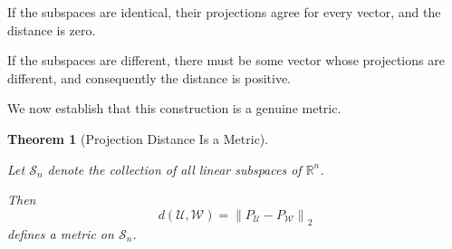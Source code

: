 \documentclass[14pt,letterpaper]{article}
\theoremstyle{plain}
\newtheorem{theorem}{Theorem}[section]
\theoremstyle{definition}
\theoremstyle{remark}
\newcommand{\R}{\mathbb{R}}
\newcommand{\norm}[1]{\left\lVert #1 \right\rVert}
\begin{document}
If the subspaces are identical,
their projections agree
for every vector, and the
distance is zero.

If the subspaces are different,
there must be some vector
whose projections are different,
and consequently the distance
is positive.

We now establish that this
construction is a genuine metric.

\begin{theorem}[Projection Distance Is a Metric]
\label{thm:projection_metric}

Let $\mathscr S_n$ denote
the collection of all linear
subspaces of $\R^n$.

Then
\[
d(\mathcal U,\mathcal W)
=
\norm{
P_{\mathcal U}-P_{\mathcal W}
}_2
\]
defines a metric on $\mathscr S_n$.

\end{theorem}
\end{document}
